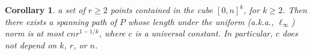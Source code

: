 \documentclass[11pt]{patmorin}
\newtheorem{corollary}[theorem]{Corollary}
\begin{document}
\begin{corollary}
a set of $r\ge 2$ points contained in the cube $[0,n]^k$,
  for $k\ge 2$.  Then there exists a spanning path of
  $P$ whose length under the uniform (a.k.a., $\ell_\infty$) norm is at
  most $cnr^{1-1/k}$, where $c$ is a universal constant. In particular,
  $c$ does not depend on $k$, $r$, or $n$.
\end{corollary}
\end{document}
